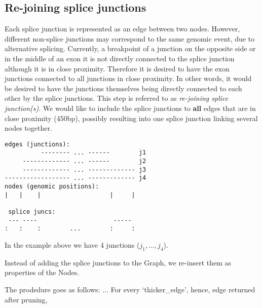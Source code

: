\documentclass{article}
\theoremstyle{definition}
\begin{document}
\clearpage

\subsection{Re-joining splice junctions}
%

Each splice junction is represented as an edge between two nodes.
However, different non-splice junctions may correspond to the same genomic event, due to alternative splicing.
Currently, a breakpoint of a junction on the opposite side or in the middle of an exon it is not directly connected to the splice junction although it is in close proximity.
Therefore it is desired to have the exon junctions connected to all junctions in close proximity.
In other words, it would be desired to have the junctions themselves being directly connected to each other by the splice junctions.
This step is referred to as \textit{re-joining splice junction(s)}.
We would like to include the splice junctions to \textbf{all} edges that are in close proximity (450bp), possibly resulting into one splice junction linking several nodes together.

\begin{verbatim}
edges (junctions):
          -------- ... ------        j1
     ------------- ... ------        j2
     ------------- ... ------------- j3
------------------ ... ------------- j4
nodes (genomic positions):
|   |    |                   |     |

 splice juncs:
 --- ----                     -----
:   :    :        ...        :     :
\end{verbatim}
In the example above we have 4 junctions ($j_1,\ldots,j_4$).

Instead of adding the splice junctions to the Graph, we re-insert them as properties of the Nodes.

The prodedure goes as follows:
...
For every `thicker\_edge', hence, edge returned after pruning, 
\end{document}
